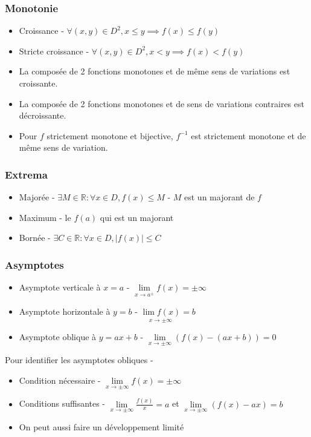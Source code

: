 \documentclass[openany]{book}
\begin{document}
\subsubsection{Monotonie}
\begin{itemize}
    \item Croissance - $\forall (x, y) \in D^2 , x \leq y \implies f(x) \leq f(y)$
    \item Stricte croissance - $ \forall (x, y) \in D^2, x < y \implies f(x) < f(y) $
    \item La composée de 2 fonctions monotones et de même sens de variations est croissante.
    \item La composée de 2 fonctions monotones et de sens de variations contraires est décroissante.
    \item Pour $f$ strictement monotone et bijective, $f^{-1}$ est strictement monotone et de même sens de variation. 
\end{itemize}

\subsubsection{Extrema}
\begin{itemize}
    \item Majorée - $\exists M \in \mathbb{R} : \forall x \in D, f(x) \leq M$ - $M$ est un majorant de $f$
    \item Maximum - le $f(a)$ qui est un majorant
    \item Bornée - $\exists C \in \mathbb{R} : \forall x \in D , |f(x)| \leq C $
\end{itemize}

\subsubsection{Asymptotes}
\begin{itemize}
    \item Asymptote verticale à $x=a$ - $\underset{x \to a^{\pm}}{\lim} f(x) = \pm \infty$
    \item Asymptote horizontale à $y=b$ - $\underset{x \to \pm \infty}{\lim f(x)} = b$
    \item Asymptote oblique à $y = ax+b$ - $\underset{x \to \pm \infty}{\lim} (f(x) - (ax + b)) = 0$
\end{itemize}

Pour identifier les asymptotes obliques -
\begin{itemize}
    \item Condition nécessaire - $\underset{x \to \pm \infty}{\lim} f(x) = \pm \infty$
    \item Conditions suffisantes - $\underset{x\to \pm \infty}{\lim} \frac{f(x)}{x} = a$ et $\underset{x\to \pm \infty}{\lim} (f(x)-ax) = b$
    \item On peut aussi faire un développement limité
\end{itemize}
\end{document}

